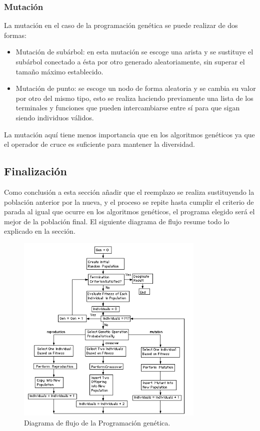 \documentclass[12pt]{article} \usepackage[utf8]{inputenc}
\begin{document}
\subsubsection{Mutación}

La mutación en el caso de la programación genética se puede realizar
de dos formas:

\begin{itemize}
\item Mutación de subárbol: en esta mutación se escoge una arista y se
  sustituye el subárbol conectado a ésta por otro generado
  aleatoriamente, sin superar el tamaño máximo establecido.
\item Mutación de punto: se escoge un nodo de forma aleatoria y se
  cambia su valor por otro del mismo tipo, esto se realiza haciendo
  previamente una lista de los terminales y funciones que pueden
  intercambiarse entre sí para que sigan siendo individuos válidos.
\end{itemize}

La mutación aquí tiene menos importancia que en los algoritmos
genéticos ya que el operador de cruce es suficiente para mantener la
diversidad.

\subsection{Finalización}

Como conclusión a esta sección añadir que el reemplazo se realiza
sustituyendo la población anterior por la nueva, y el proceso se
repite hasta cumplir el criterio de parada al igual que ocurre en los
algoritmos genéticos, el programa elegido será el mejor de la
población final. El siguiente diagrama de flujo resume todo lo
explicado en la sección.

\begin{figure}[H]
  \centering
  \includegraphics[width=0.8\textwidth]{FlowchartGP.PNG}
  \caption{Diagrama de flujo de la Programación genética.}
  \label{fig:dfd:1}
\end{figure}
\end{document}
